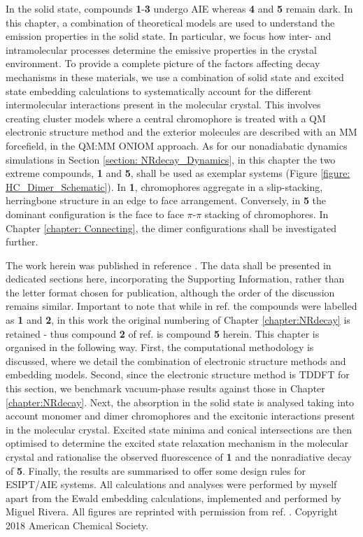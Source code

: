 In the solid state, compounds \textbf{1}-\textbf{3} undergo \ac{AIE} whereas \textbf{4} and \textbf{5} remain dark. In this chapter, a combination of theoretical models are used to understand the emission properties in the solid state. In particular, we focus how inter- and intramolecular processes determine the emissive properties in the crystal environment. To provide a complete picture of the factors affecting decay mechanisms in these materials, we use a combination of solid state and excited state embedding calculations to systematically account for the different intermolecular interactions present in the molecular crystal. This involves creating cluster models where a central chromophore is treated with a QM electronic structure method and the exterior molecules are described with an \ac{MM} forcefield, in the QM:MM ONIOM approach. As for our nonadiabatic dynamics simulations in Section \ref{section: NRdecay_Dynamics}, in this chapter the two extreme compounds, \textbf{1} and \textbf{5}, shall be used as exemplar systems (Figure \ref{figure: HC_Dimer_Schematic}). In \textbf{1}, chromophores aggregate in a slip-stacking, herringbone structure in an edge to face arrangement. Conversely, in \textbf{5} the dominant configuration is the face to face $\pi$-$\pi$ stacking of chromophores. In Chapter \ref{chapter: Connecting}, the dimer configurations shall be investigated further.

The work herein was published in reference . The data shall be presented in dedicated sections here, incorporating the Supporting Information, rather than the letter format chosen for publication, although the order of the discussion remains similar. Important to note that while in ref.  the compounds were labelled as \textbf{1} and \textbf{2}, in this work the original numbering of Chapter \ref{chapter:NRdecay} is retained - thus compound \textbf{2} of ref.  is compound \textbf{5} herein. This chapter is organised in the following way. First, the computational methodology is discussed, where we detail the combination of electronic structure methods and embedding models. Second, since the electronic structure method is \ac{TDDFT} for this section, we benchmark vacuum-phase results against those in Chapter \ref{chapter:NRdecay}. Next, the absorption in the solid state is analysed taking into account monomer and dimer chromophores and the excitonic interactions present in the molecular crystal. Excited state minima and conical intersections are then optimised to determine the excited state relaxation mechanism in the molecular crystal and rationalise the observed fluorescence of \textbf{1} and the nonradiative decay of \textbf{5}. Finally, the results are summarised to offer some design rules for ESIPT/AIE systems. All calculations and analyses were performed by myself apart from the Ewald embedding calculations, implemented and performed by Miguel Rivera. All figures are reprinted with permission from ref. . Copyright 2018 American Chemical Society.
